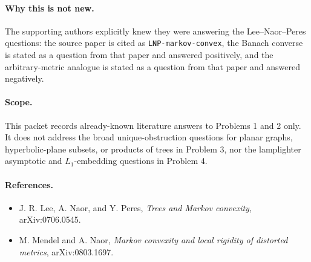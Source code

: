 \documentclass[11pt]{article}
\begin{document}
\paragraph{Why this is not new.}
The supporting authors explicitly knew they were answering the Lee--Naor--Peres
questions: the source paper is cited as \texttt{LNP-markov-convex}, the
Banach converse is stated as a question from that paper and answered
positively, and the arbitrary-metric analogue is stated as a question from that
paper and answered negatively.

\paragraph{Scope.}
This packet records already-known literature answers to Problems 1 and 2 only.
It does not address the broad unique-obstruction questions for planar graphs,
hyperbolic-plane subsets, or products of trees in Problem 3, nor the
lamplighter asymptotic and \(L_1\)-embedding questions in Problem 4.

\paragraph{References.}
\begin{itemize}
\item J. R. Lee, A. Naor, and Y. Peres, \emph{Trees and Markov convexity},
  arXiv:0706.0545.
\item M. Mendel and A. Naor, \emph{Markov convexity and local rigidity of
  distorted metrics}, arXiv:0803.1697.
\end{itemize}
\end{document}

